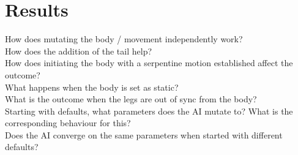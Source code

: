 \documentclass{article}
\begin{document}
\section{Results}
How does mutating the body / movement independently work?\\
How does the addition of the tail help?\\
How does initiating the body with a serpentine motion established affect the outcome?\\
What happens when the body is set as static?\\
What is the outcome when the legs are out of sync from the body?\\
Starting with defaults, what parameters does the AI mutate to? What is the corresponding behaviour for this?\\
Does the AI converge on the same parameters when started with different defaults?\\
\end{document}
